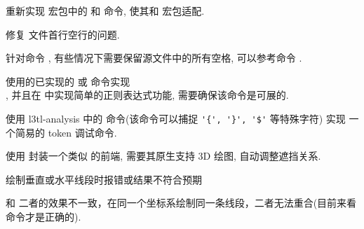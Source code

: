 \documentclass[
  hyper, 
  lang = cn, 
  class = l3doc,
  classOption={11pt},
  sect = {load=false},
]{../../zlatex/code/ztex}
\begin{document}
\let\olditem\item
{}
  {
      {\color{black}%
        \olditem{}\color{gray}}
      {\color{black}%
        \olditem}
  }
\begin{todolist}
  \item 重新实现  宏包中的  和  命令, 使其和  宏包适配.
  \item [2025-05-22] 修复  文件首行空行的问题.
  \item [2025-09-01] 针对命令 , 有些情况下需要保留源文件中的所有空格, 可以参考命令 .
  \item 使用的已实现的  或  命令实现 
     \texttt{}\\ 
    \texttt{}, 并且在  中实现简单的正则表达式功能, 需要确保该命令是可展的.
  \item 使用 \textsf{l3tl-analysis} 中的  命令(该命令可以捕捉 \verb|'{', '}', '$'| 等特殊字符) 实现
    一个简易的 token 调试命令.
  \item 使用  封装一个类似  的前端, 需要其原生支持 3D 绘图, 自动调整遮挡关系.
  \item [2025-07-09]  绘制垂直或水平线段时报错或结果不符合预期
  \item {} 和  二者的效果不一致，在同一个坐标系绘制同一条线段，二者无法重合(目前来看  命令才是正确的).
\end{todolist}



\cleardoublepage
\ztexDocPrintSource

\PrintIndex
\end{document}
